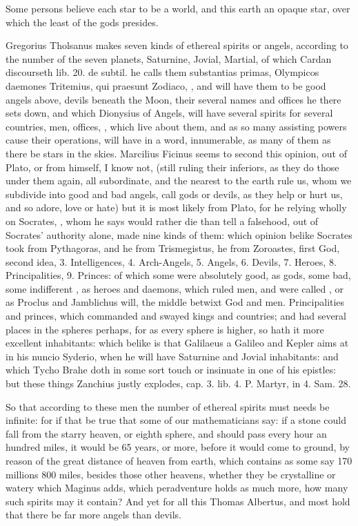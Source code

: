 {{Some persons believe each star to be a world, and this earth an opaque
star, over which the least of the gods presides.

Gregorius Tholsanus makes seven kinds of ethereal spirits or
angels, according to the number of the seven planets, Saturnine,
Jovial, Martial, of which Cardan discourseth lib. 20. de subtil. he
calls them substantias primas, Olympicos daemones Tritemius, qui
praesunt Zodiaco, \etc{}, and will have them to be good angels above,
devils beneath the Moon, their several names and offices he there sets
down, and which Dionysius of Angels, will have several spirits for
several countries, men, offices, \etc{}, which live about them, and as so
many assisting powers cause their operations, will have in a word,
innumerable, as many of them as there be stars in the skies.
Marcilius Ficinus seems to second this opinion, out of Plato, or
from himself, I know not, (still ruling their inferiors, as they do
those under them again, all subordinate, and the nearest to the earth
rule us, whom we subdivide into good and bad angels, call gods or
devils, as they help or hurt us, and so adore, love or hate) but it is
most likely from Plato, for he relying wholly on Socrates, , whom he says would rather die
than tell a falsehood, out of Socrates' authority alone, made nine
kinds of them: which opinion belike Socrates took from Pythagoras, and
he from \textlatin{Trismegistus}, he from Zoroastes, first God, second idea, 3.
Intelligences, 4. Arch-Angels, 5. Angels, 6. Devils, 7. Heroes, 8.
Principalities, 9. Princes: of which some were absolutely good, as
gods, some bad, some indifferent , as heroes and
daemons, which ruled men, and were called , or as Proclus
and Jamblichus will, the middle betwixt God and men. Principalities and
princes, which commanded and swayed kings and countries; and had
several places in the spheres perhaps, for as every sphere is higher,
so hath it more excellent inhabitants: which belike is that Galilaeus a
Galileo and Kepler aims at in his \textlatin{nuncio Syderio}, when he will have
Saturnine and Jovial inhabitants: and which Tycho Brahe doth in
some sort touch or insinuate in one of his epistles: but these things
Zanchius justly explodes, cap. 3. lib. 4. P. Martyr, in 4. Sam. 28.

So that according to these men the number of ethereal spirits must
needs be infinite: for if that be true that some of our mathematicians
say: if a stone could fall from the starry heaven, or eighth sphere,
and should pass every hour an hundred miles, it would be 65 years, or
more, before it would come to ground, by reason of the great distance
of heaven from earth, which contains as some say 170 millions 800
miles, besides those other heavens, whether they be crystalline or
watery which Maginus adds, which peradventure holds as much more, how
many such spirits may it contain? And yet for all this Thomas
Albertus, and most hold that there be far more angels than devils.

}}
